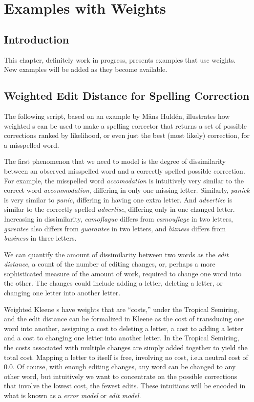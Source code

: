 \chapter{Examples with Weights}

\label{chapt:exampleswithweights}

\section{Introduction}

This chapter, definitely work in progress, presents examples that
use weights.  New examples will be added as they become available.

\section{Weighted Edit Distance for Spelling Correction}

The following script, based on an example by M\r{a}ns Huldén, illustrates how weighted \fst{}s
can be used to make a spelling corrector that returns a set of possible
corrections ranked by likelihood, or even just the best (most likely)
correction, for a misspelled word.

The first phenomenon that we need to model is the degree of dissimilarity between an
observed misspelled word and a correctly spelled possible correction.  For example, the misspelled
word \emph{accomodation} is intuitively very similar to the correct word
\emph{accommodation}, differing in only one missing letter.  Similarly,
\emph{panick}
is very similar to \emph{panic}, differing in having one extra letter.  And
\emph{advertize} is similar to the correctly spelled \emph{advertise}, differing only
in one changed letter. Increasing in dissimilarity, \emph{camoflague} differs from
\emph{camouflage} in two letters, \emph{garentee} also differs from
\emph{guarantee} in
two letters, and \emph{bizness} differs from \emph{business} in three letters.

We can quantify the amount of dissimilarity between two words as the \emph{edit distance},
a count of the number of editing changes, or, perhaps a more sophisticated measure
of the amount of work, required to change one word into the
other.  The changes could include adding a letter, deleting a letter, or changing
one letter into another letter.

Weighted Kleene \fst{}s have weights that are ``costs,'' under the Tropical Semiring, and
the edit distance can be formalized in Kleene as the cost of
transducing one word into another, assigning a cost to deleting a
letter, a cost to adding a letter and a cost to changing one letter into
another letter.  In the Tropical Semiring, the costs associated with multiple changes are simply
added together to yield the total cost.  Mapping a letter to itself is free, involving no cost,
i.e.\@ a neutral cost of 0.0.  Of
course, with
enough editing changes, any word can be changed to any other word,
but intuitively we want to concentrate on the possible corrections that
involve the lowest cost, the fewest edits.  These intuitions will be encoded in what is known 
as a \emph{error model} or \emph{edit model}.


